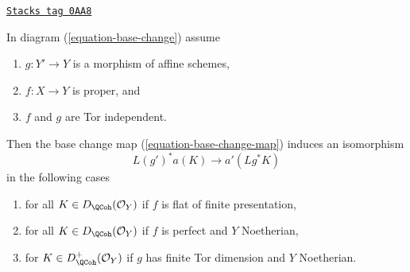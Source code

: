 \begin{lemma}
\label{duality-lemma-more-base-change}
\href{https://stacks.math.columbia.edu/tag/0AA8}{\texttt{Stacks tag 0AA8}}

In diagram (\ref{equation-base-change}) assume
\begin{enumerate}
\item $g : Y' \to Y$ is a morphism of affine schemes,
\item $f : X \to Y$ is proper, and
\item $f$ and $g$ are Tor independent.
\end{enumerate}
Then the base change map (\ref{equation-base-change-map}) induces an
isomorphism
$$
L(g')^*a(K) \longrightarrow a'(Lg^*K)
$$
in the following cases
\begin{enumerate}
\item for all $K \in D_\QCoh(\mathcal{O}_Y)$ if $f$
is flat of finite presentation,
\item for all $K \in D_\QCoh(\mathcal{O}_Y)$ if $f$
is perfect and $Y$ Noetherian,
\item for $K \in D_\QCoh^+(\mathcal{O}_Y)$ if $g$ has finite Tor dimension
and $Y$ Noetherian.
\end{enumerate}
\end{lemma}

